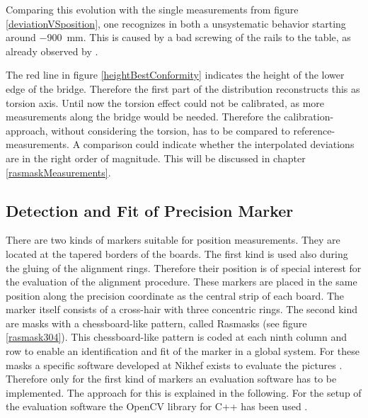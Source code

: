 \documentclass[
twoside,            %
BCOR1.4cm,          %
10pt,               %
headings=normal,    %
headsepline,        %
clearplainpage,		%
final,              %
div=14,
open=right,
bibliography=toc
]{scrreprt}
\begin{document}
Comparing this evolution with the single measurements from figure \ref{deviationVSposition}, one recognizes in both a unsystematic behavior starting around \SI{-900}{mm}.
This is caused by a bad screwing of the rails to the table, as already observed by \cite{muellerThesis}.

The red line in figure \ref{heightBestConformity} indicates the height of the lower edge of the bridge.
Therefore the first part of the distribution reconstructs this as torsion axis. 
Until now the torsion effect could not be calibrated, as more measurements along the bridge would be needed.
Therefore the calibration-approach, without considering the torsion, has to be compared to reference-measurements.
A comparison could indicate whether the interpolated deviations are in the right order of magnitude.
This will be discussed in chapter \ref{rasmaskMeasurements}.

\subsection{Detection and Fit of Precision Marker} \label{markerFitChapter}

There are two kinds of markers suitable for position measurements. 
They are located at the tapered borders of the boards.
The first kind is used also during the gluing of the alignment rings. 
Therefore their position is of special interest for the evaluation of the alignment procedure.
These markers are placed in the same position along the precision coordinate as the central strip of each board.
The marker itself consists of a cross-hair with three concentric rings.
The second kind are masks with a chessboard-like pattern, called Rasmasks (see figure \ref{rasmask304}).
This chessboard-like pattern is coded at each ninth column and row to enable an identification and fit of the marker in a global system.
For these masks a specific software developed at Nikhef exists to evaluate the pictures \cite{rasnik}.
Therefore only for the first kind of markers an evaluation software has to be implemented.
The approach for this is explained in the following.
For the setup of the evaluation software the OpenCV library for C++ has been used 
\cite{openCVlibrary}.
\end{document}
